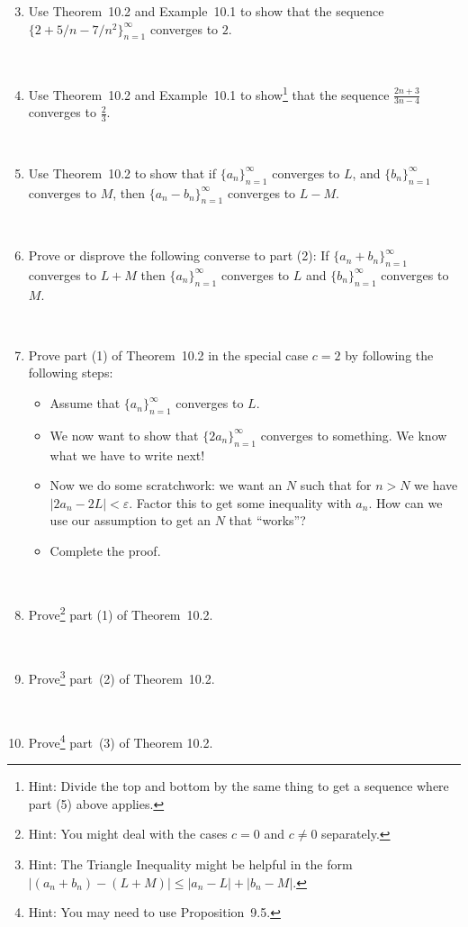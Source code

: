 \documentclass[12pt]{amsart}
\def\e{\varepsilon}
\numberwithin{equation}{section}
\theoremstyle{plain} %
\theoremstyle{definition}
\theoremstyle{remark}
\begin{document}
\begin{enumerate}\setcounter{enumi}{2}

\item Use Theorem~10.2 and Example~10.1 to show that the sequence $\{2 + 5/n - 7/n^2\}_{n=1}^\infty$ converges to $2$.

\

\item Use Theorem~10.2 and Example~10.1 to show\footnote{Hint: Divide the top and bottom by the same thing to get a sequence where part (5) above applies.} that the sequence $\frac{2n+3}{3n-4}$ converges to $\frac23$.

\

\item Use Theorem~10.2 to show that if $\{a_n\}_{n=1}^\infty$ converges to $L$, and $\{b_n\}_{n=1}^\infty$ converges to $M$, then $\{a_n - b_n\}_{n=1}^\infty$ converges to $L-M$.

\

\item Prove or disprove the following converse to part (2): If $\{ a_n + b_n \}_{n=1}^\infty$ converges to $L+M$ then $\{a_n \}_{n=1}^\infty$ converges to $L$ and $\{ b_n \}_{n=1}^\infty$ converges to $M$.

\

\item Prove part (1) of Theorem~10.2  in the special case $c=2$ by following the following steps:
\begin{itemize}
\item Assume that $\{a_n \}_{n=1}^\infty$ converges to $L$.
\item We now want to show that $\{ 2 a_n \}_{n=1}^\infty$ converges to something. We know what we have to write next!
\item Now we do some scratchwork: we want an $N$ such that for $n>N$ we have $|2 a_n - 2 L| < \e$. Factor this to get some inequality with $a_n$. How can we use our assumption to get an $N$ that ``works''?
\item Complete the proof.
\end{itemize}


\


\item Prove\footnote{Hint: You might deal with the cases $c=0$ and $c\neq 0$ separately.} part (1) of Theorem~10.2.

\

\item Prove\footnote{Hint: The Triangle Inequality might be helpful in the form $|(a_n + b_n) - (L+M)|  \leq  |a_n - L| + |b_n - M|$.} part~(2) of Theorem~10.2.

\

\item Prove\footnote{Hint: You may need to use Proposition~9.5.} part~(3) of Theorem 10.2.
\end{enumerate}
\end{document}
